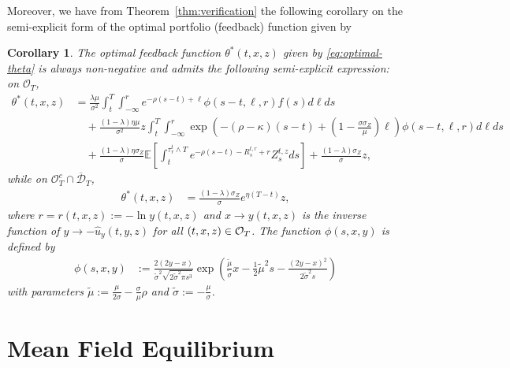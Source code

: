 \documentclass[11pt,times,letter]{article}
\newcommand{\Ex}{ \mathbb{E} }
\numberwithin{equation}{section}
\newtheorem{corollary}[theorem]{Corollary}
\begin{document}
Moreover, we have from Theorem~\ref{thm:verification} the following corollary on the semi-explicit form of the optimal portfolio (feedback) function given by
\begin{corollary}\label{coro:optimal-portfolio}
The optimal feedback function $\theta^*(t,x,z)$ given by \eqref{eq:optimal-theta} is always non-negative and  admits the following semi-explicit expression: on $\mathcal{O}_T$,
\begin{align}\label{optimal-portfolio-O}
\theta^*(t,x,z)&=\frac{\lambda \mu}{\sigma^2} \int_{t}^{T}\int_{-\infty}^{r} e^{-\rho (s-t)+\ell}\phi(s-t,\ell,r)f(s)d\ell ds\nonumber\\
&\quad+\frac{(1-\lambda)\eta \mu}{\sigma^2} z\int_{t}^{T}\int_{-\infty}^{r} \exp\left(-(\rho-\kappa)(s-t)+\left(1-\frac{\sigma\sigma_Z}{\mu}\right)\ell\right) \phi(s-t,\ell,r)d\ell ds\nonumber\\
&\quad+\frac{(1-\lambda)\eta\sigma_Z}{\sigma}  \Ex\left[ \int_t^{\tau_{r}^t \wedge T}e^{-\rho (s-t)-R^{t,r}_s+r}Z_s^{t,z} ds\right]+\frac{(1-\lambda)\sigma_Z}{\sigma}z,
\end{align} 
while on $\mathcal{O}_T^c \cap \overline{\mathcal{D}}_T$,
\begin{align}\label{optimal-portfolio-Oc}
\theta^*(t,x,z)&=\frac{(1-\lambda)\sigma_Z}{\sigma}e^{\eta (T-t)}z,
\end{align}
where $r=r(t,x,z):=-\ln y(t,x,z)$ and $x\to y(t,x,z)$ is the inverse function of $y\to-\hat{u}_y(t,y,z)$ for all $(t,x,z)\in {\cal O}_T$. The function $\phi(s,x,y)$ is defined by 
\begin{align}\label{eq:phi}
\phi(s,x,y)&:= \frac{2(2 y-x)}{\tilde{\sigma}^2\sqrt{2\tilde{\sigma}^2 \pi s^3}}\exp \left(\frac{\tilde{\mu}}{\tilde{\sigma}} x-\frac{1}{2} \tilde{\mu}^2 s-\frac{(2 y-x)^2}{2\tilde{\sigma}^2 s}\right)
\end{align}
with parameters $\tilde{\mu}:=\frac{\mu}{2\sigma}-\frac{\sigma}{\mu}\rho$ and $\tilde{\sigma}:=-\frac{\mu}{\sigma}$.
\end{corollary}

\section{Mean Field Equilibrium}\label{sec:MFG}
\end{document}
